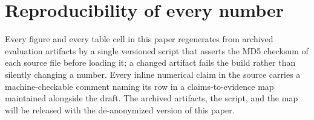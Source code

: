 \section{Reproducibility of every number}
\label{app:repro}

Every figure and every table cell in this paper regenerates from archived
evaluation artifacts by a single versioned script that asserts the MD5
checksum of each source file before loading it; a changed artifact fails
the build rather than silently changing a number. Every inline numerical
claim in the source carries a machine-checkable comment naming its row in
a claims-to-evidence map maintained alongside the draft. The archived
artifacts, the script, and the map will be released with the
de-anonymized version of this paper.
